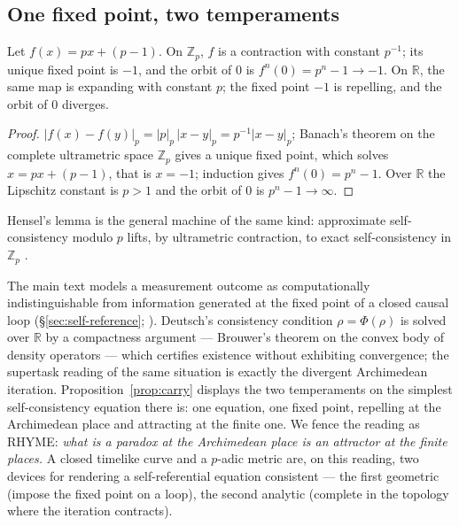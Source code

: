 \subsection{One fixed point, two temperaments}
\label{app:padic-carry}

\begin{proposition}\label{prop:carry}
Let $f(x) = px + (p-1)$. On $\mathbb{Z}_p$, $f$ is a contraction with constant
$p^{-1}$; its unique fixed point is $-1$, and the orbit of $0$ is
$f^{n}(0) = p^{n} - 1 \to -1$. On $\mathbb{R}$, the same map is expanding with constant
$p$; the fixed point $-1$ is repelling, and the orbit of $0$ diverges.
\end{proposition}

\begin{proof}
$|f(x) - f(y)|_p = |p|_p\,|x - y|_p = p^{-1}|x - y|_p$; Banach's theorem on the
complete ultrametric space $\mathbb{Z}_p$ gives a unique fixed point, which solves
$x = px + (p-1)$, that is $x = -1$; induction gives $f^{n}(0) = p^{n} - 1$. Over
$\mathbb{R}$ the Lipschitz constant is $p > 1$ and the orbit of $0$ is
$p^{n} - 1 \to \infty$.
\end{proof}

\begin{remark}[Hensel]\label{rem:hensel}
Hensel's lemma is the general machine of the same kind: approximate self-consistency
modulo $p$ lifts, by ultrametric contraction, to exact self-consistency in
$\mathbb{Z}_p$ \autocite{gouvea1997, serre1973}.
\end{remark}

The main text models a measurement outcome as computationally indistinguishable from
information generated at the fixed point of a closed causal loop
(\S\ref{sec:self-reference}; \autocite{deutsch1991, aaronsonwatrous2009}). Deutsch's
consistency condition $\rho = \Phi(\rho)$ is solved over $\mathbb{R}$ by a compactness
argument --- Brouwer's theorem on the convex body of density operators --- which
certifies existence without exhibiting convergence; the supertask reading of the same
situation \autocite{laraudogoitia1998} is exactly the divergent Archimedean iteration.
Proposition~\ref{prop:carry} displays the two temperaments on the simplest
self-consistency equation there is: one equation, one fixed point, repelling at the
Archimedean place and attracting at the finite one. We fence the reading as RHYME:
\emph{what is a paradox at the Archimedean place is an attractor at the finite
places.} A closed timelike curve and a $p$-adic metric are, on this reading, two
devices for rendering a self-referential equation consistent --- the first geometric
(impose the fixed point on a loop), the second analytic (complete in the topology
where the iteration contracts).

